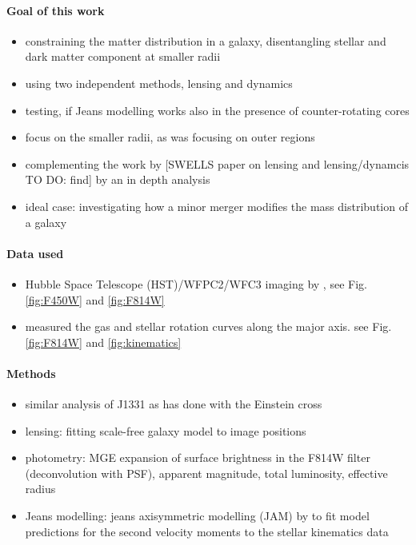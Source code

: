 \paragraph{Goal of this work}
\begin{itemize}
\item constraining the matter distribution in a galaxy, disentangling stellar and dark matter component at smaller radii
\item using two independent methods, lensing and dynamics
\item testing, if Jeans modelling works also in the presence of counter-rotating cores
\item focus on the smaller radii, as \citet{SWELLSV} was focusing on outer regions
\item complementing the work by [SWELLS paper on lensing and lensing/dynamcis TO DO: find] by an in depth analysis
\item ideal case: investigating how a minor merger modifies the mass distribution of a galaxy
\end{itemize}


\paragraph{Data used}
\begin{itemize}
\item Hubble Space Telescope (HST)/WFPC2/WFC3 imaging by \cite{SWELLSI}, see Fig. \ref{fig:F450W} and \ref{fig:F814W}
\item  \citet{SWELLSV} measured the gas and stellar rotation curves along the major axis. see Fig. \ref{fig:F814W} and \ref{fig:kinematics}
\end{itemize}

\paragraph{Methods}
\begin{itemize}
\item similar analysis of J1331 as \citet{GlennEC} has done with the Einstein cross
\item lensing: fitting scale-free galaxy model to image positions \citep{EvansWitt}
\item photometry: MGE expansion of surface brightness in the F814W filter (deconvolution with PSF), apparent magnitude, total luminosity, effective radius
\item Jeans modelling: jeans axisymmetric modelling (JAM) by \citet{Cap08} to fit model predictions for the second velocity moments to the stellar kinematics data
\end{itemize}

